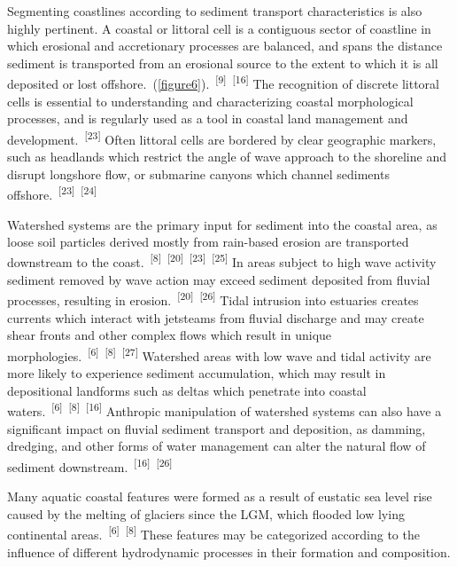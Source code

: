 \documentclass{article}
\begin{document}
\newpage
{}
\fancyfoot[C]{\thepage} 
\thispagestyle{fancy}

{Segmenting coastlines according to sediment transport characteristics is also highly pertinent. A coastal or littoral cell is a contiguous sector of coastline in which erosional and accretionary processes are balanced, and spans the distance sediment is transported from an erosional source to the extent to which it is all deposited or lost offshore.~(\cref{figure6}).~\textsuperscript{[9]}~\textsuperscript{[16]} The recognition of discrete littoral cells is essential to understanding and characterizing coastal morphological processes, and is regularly used as a tool in coastal land management and development.~\textsuperscript{[23]} Often littoral cells are bordered by clear geographic markers, such as headlands which restrict the angle of wave approach to the shoreline and disrupt longshore flow, or submarine canyons which channel sediments offshore.~\textsuperscript{[23]}~\textsuperscript{[24]} \par}

\par{Watershed systems are the primary input for sediment into the coastal area, as loose soil particles derived mostly from rain-based erosion are transported downstream to the coast.~\textsuperscript{[8]}~\textsuperscript{[20]}~\textsuperscript{[23]}~\textsuperscript{[25]} In areas subject to high wave activity sediment removed by wave action may exceed sediment deposited from fluvial processes, resulting in erosion.~\textsuperscript{[20]}~\textsuperscript{[26]} Tidal intrusion into estuaries creates currents which interact with jetsteams from fluvial discharge and may create shear fronts and other complex flows which result in unique morphologies.~\textsuperscript{[6]}~\textsuperscript{[8]}~\textsuperscript{[27]} Watershed areas with low wave and tidal activity are more likely to experience sediment accumulation, which may result in depositional landforms such as deltas which penetrate into coastal waters.~\textsuperscript{[6]}~\textsuperscript{[8]}~\textsuperscript{[16]} Anthropic manipulation of watershed systems can also have a significant impact on fluvial sediment transport and deposition, as damming, dredging, and other forms of water management can alter the natural flow of sediment downstream.~\textsuperscript{[16]}~\textsuperscript{[26]}}

\par{Many aquatic coastal features were formed as a result of eustatic sea level rise caused by the melting of glaciers since the LGM, which flooded low lying continental areas.~\textsuperscript{[6]}~\textsuperscript{[8]} These features may be categorized according to the influence of different hydrodynamic processes in their formation and composition.} 
\end{document}

